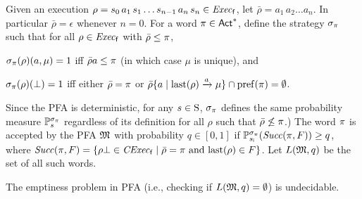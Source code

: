 Given an execution
$\rho = s_0\,a_1\,s_1\ldots s_{n-1}\,a_n\,s_n \in \execf$,
let $\bar{\rho} = a_1\, a_2\ldots a_n$.  In particular
$\bar{\rho} = \epsilon$ whenever $n=0$.
%
For a word $\plan\in\Act^*$, define the strategy $\strat_\plan$ such
that for all $\rho\in\execf$ with $\bar{\rho}\leq\plan$,
%
\begin{enumerate*}[(i)]
\item%
  $\strat_\plan(\rho)(a,\mu)=1$ iff $\bar{\rho}a\leq\plan$ (in which
  case $\mu$ is unique), and
\item%
  $\strat_\plan(\rho)(\complete)=1$ iff either $\bar{\rho}=\plan$ or
  $\bar{\rho}\{a\mid{\last(\rho)\reach{a}\mu}\}\cap\pref(\plan) = \emptyset$.
\end{enumerate*}
%
Since the PFA is deterministic, for any $s\in\S$, $\strat_\plan$
defines the same probability measure $\Prob_s^{\strat_\plan}$
regardless of its definition for all $\rho$ such that
$\bar{\rho}\not\leq\plan$.) 
%
The word $\plan$ is accepted by the PFA $\model$ with probability
$q\in[0,1]$ if $\Prob_{\sini}^{\strat_\plan}(\Succ(\plan,F))\geq q$, where
$\Succ(\plan,F)=\{{\rho\complete\in\cexecf}\mid{\bar{\rho}=\plan \text{ and } \last(\rho)\in F}\}$.
%
Let $L(\model,q)$ be the set of all such words.

\begin{proposition}{\cite{MadaniHC99}}\label{prop:empty:PFA:undecidable}
  The emptiness problem in PFA (i.e., checking if
  $L(\model,q)=\emptyset$) is undecidable.
\end{proposition}


